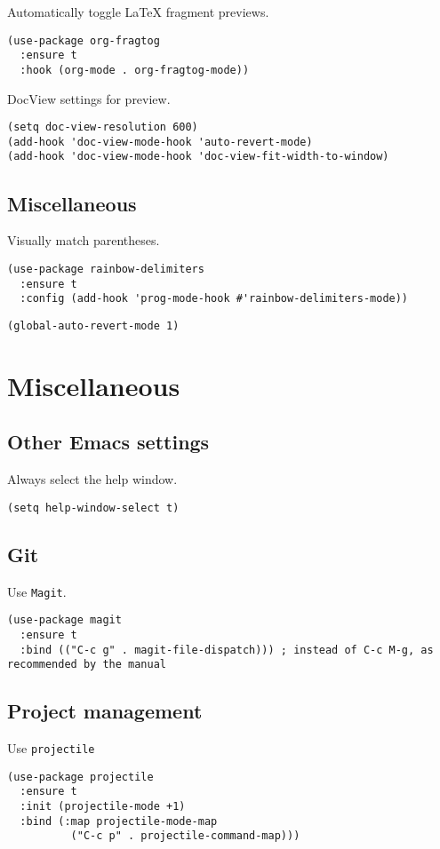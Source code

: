 \documentclass[a4paper,11pt]{article}
\begin{document}
Automatically toggle \LaTeX{} fragment previews.
\begin{verbatim}
(use-package org-fragtog
  :ensure t
  :hook (org-mode . org-fragtog-mode))
\end{verbatim}

DocView settings for preview.
\begin{verbatim}
(setq doc-view-resolution 600)
(add-hook 'doc-view-mode-hook 'auto-revert-mode)
(add-hook 'doc-view-mode-hook 'doc-view-fit-width-to-window)
\end{verbatim}

\subsection{Miscellaneous}
\label{sec:org3475140}
Visually match parentheses.
\begin{verbatim}
(use-package rainbow-delimiters
  :ensure t
  :config (add-hook 'prog-mode-hook #'rainbow-delimiters-mode))
\end{verbatim}

\begin{verbatim}
(global-auto-revert-mode 1)
\end{verbatim}

\section{Miscellaneous}
\label{sec:orgc218ebf}
\subsection{Other Emacs settings}
\label{sec:org37fcd2c}
Always select the help window.
\begin{verbatim}
(setq help-window-select t)
\end{verbatim}

\subsection{Git}
\label{sec:orgc757d17}
Use \texttt{Magit}.
\begin{verbatim}
(use-package magit
  :ensure t
  :bind (("C-c g" . magit-file-dispatch))) ; instead of C-c M-g, as recommended by the manual
\end{verbatim}

\subsection{Project management}
\label{sec:org39f3700}
Use \texttt{projectile}
\begin{verbatim}
(use-package projectile
  :ensure t
  :init (projectile-mode +1)
  :bind (:map projectile-mode-map
	      ("C-c p" . projectile-command-map)))
\end{verbatim}
\end{document}
